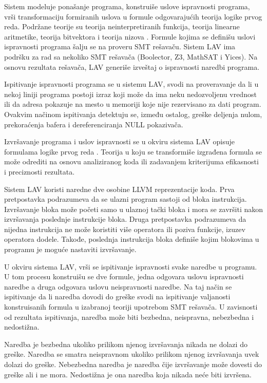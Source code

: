 \documentclass[12pt,oneside]{memoir}
\begin{document}
Sistem modeluje ponašanje programa, konstruiše uslove ispravnosti programa, vrši transformaciju formiranih uslova u formule odgovarajućih teorija logike prvog reda. Podržane teorije su teorija neinterpretiranih funkcija, teorija linearne aritmetike, teorija bitvektora i teorija nizova \cite{Barrett}. Formule kojima se definišu uslovi ispravnosti programa šalju se na proveru SMT rešavaču. Sistem LAV ima podršku za rad sa nekoliko SMT rešavača (Boolector, Z3, MathSAT i Yices). Na osnovu rezultata rešavača, LAV generiše izveštaj o ispravnosti naredbi programa.
\par

Ispitivanje ispravnosti programa se u sistemu LAV, svodi na proveravanje da li u nekoj liniji programa postoji izraz koji može da ima neku nedozvoljenu vrednost ili da adresa pokazuje na mesto u memoriji koje nije rezervisano za dati program. Ovakvim načinom ispitivanja detektuju se, između ostalog, greške deljenja nulom, prekoraćenja bafera i dereferenciranja NULL pokazivača.

\par

Izvršavanje programa i uslov ispravnosti se u okviru sistema LAV opisuje formulama logike prvog reda \cite{LAVDevelopment}. Teorija u koju se transformiše izgrađena formula se može odrediti na osnovu analiziranog koda ili zadavanjem kriterijuma efikasnosti i preciznosti rezultata.
\par

Sistem LAV koristi naredne dve osobine LLVM reprezentacije koda. Prva pretpostavka podrazumeva da se ulazni program sastoji od bloka instrukcija. Izvršavanje bloka može početi samo u ulaznoj tački bloka i mora se završiti nakon izvršavanja poslednje instrukcije bloka. Druga pretpostavka podrazumeva da nijedna instrukcija ne može koristiti više operatora ili poziva funkcije, izuzev operatora dodele. Takođe, poslednja instrukcija bloka definiše kojim blokovima u programu je moguće nastaviti izvršavanje.
\par
U okviru sistema LAV, vrši se ispitivanje ispravnosti svake naredbe u programu. U tom procesu konstruišu se dve formule, jedna odgovara uslovu ispravnosti naredbe a druga odgovara uslovu neispravnosti naredbe. Na taj način se ispitivanje da li naredba dovodi do greške svodi na ispitivanje valjanosti konstruisanih formula u izabranoj teoriji upotrebom SMT rešavača. U zavisnosti od rezultata ispitivanja, naredba može biti bezbedna, neispravna, nebezbedna i nedostižna. \par 
Naredba je bezbedna	ukoliko prilikom njenog izvršavanja nikada ne dolazi do greške. Naredba se smatra neispravnom ukoliko prilikom njenog izvršavanja uvek dolazi do greške. Nebezbedna naredba je naredba čije izvršavanje može dovesti do greške ali i ne mora. Nedostižna je ona naredba koja nikada neće biti izvršena.
\end{document}
